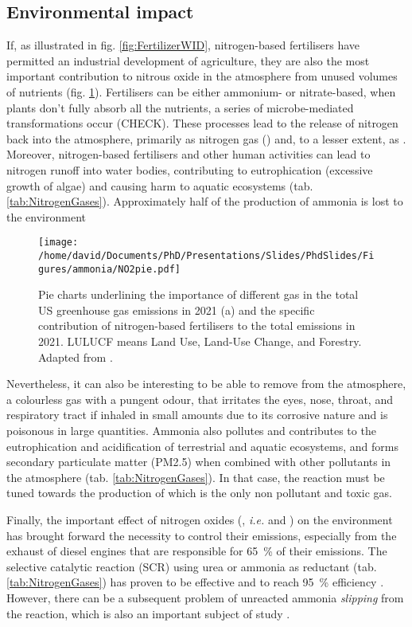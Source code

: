 \subsection{Environmental impact}

If, as illustrated in fig. \ref{fig:FertilizerWID}, nitrogen-based fertilisers have permitted an industrial development of agriculture, they are also the most important contribution to nitrous oxide in the atmosphere from unused volumes of nutrients (fig. \ref{fig:PieGreenhouseNO2}).
Fertilisers can be either ammonium- or nitrate-based, when plants don't fully absorb all the nutrients, a series of microbe-mediated transformations occur (CHECK).
These processes lead to the release of nitrogen back into the atmosphere, primarily as nitrogen gas (\nitrogen) and, to a lesser extent, as \nitrousoxide.
Moreover, nitrogen-based fertilisers and other human activities can lead to nitrogen runoff into water bodies, contributing to eutrophication (excessive growth of algae) and causing harm to aquatic ecosystems (tab. \ref{tab:NitrogenGases}).
Approximately half of the production of ammonia is lost to the environment \parencite{Erisman2007}

\begin{figure}[!htb]
    \centering
    \texttt{[image: /home/david/Documents/PhD/Presentations/Slides/PhdSlides/Figures/ammonia/NO2pie.pdf]}
    \caption{
    Pie charts underlining the importance of different gas in the total US greenhouse gas emissions in 2021 (a) and the specific contribution of nitrogen-based fertilisers to the total  emissions in 2021.
    LULUCF means Land Use, Land-Use Change, and Forestry.
    Adapted from \cite{EPAGreenhouseGases}.
    }
    \label{fig:PieGreenhouseNO2}
\end{figure}

Nevertheless, it can also be interesting to be able to remove  from the atmosphere, a colourless gas with a pungent odour, that irritates the eyes, nose, throat, and respiratory tract if inhaled in small amounts due to its corrosive nature and is poisonous in large quantities.
Ammonia also pollutes and contributes to the eutrophication and acidification of terrestrial and aquatic ecosystems, and forms secondary particulate matter (PM2.5) when combined with other pollutants in the atmosphere (tab. \ref{tab:NitrogenGases}).
In that case, the reaction must be tuned towards the production of  which is the only non pollutant and toxic gas.

Finally, the important effect of nitrogen oxides (, \textit{i.e.}  and ) on the environment has brought forward the necessity to control their emissions, especially from the exhaust of diesel engines that are responsible for \qty{65}{\percent} of their emissions.
The selective catalytic reaction (SCR) using urea or ammonia as reductant (tab. \ref{tab:NitrogenGases}) has proven to be effective and to reach \qty{95}{\percent} efficiency \parencite{MitsubishiSCR}.
However, there can be a subsequent problem of unreacted ammonia \textit{slipping} from the reaction, which is also an important subject of study \parencite{Thermofischer}.

